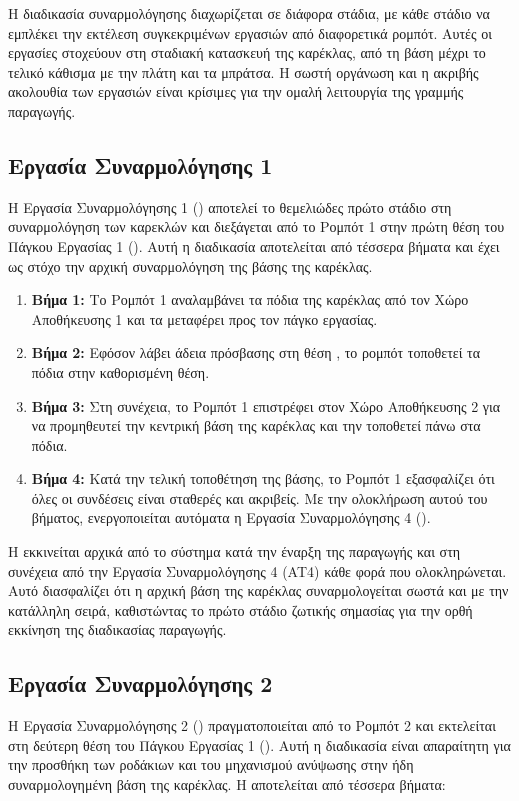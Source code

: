 Η διαδικασία συναρμολόγησης διαχωρίζεται σε διάφορα στάδια, με κάθε στάδιο να εμπλέκει την εκτέλεση συγκεκριμένων εργασιών από διαφορετικά ρομπότ. Αυτές οι εργασίες στοχεύουν στη σταδιακή κατασκευή της καρέκλας, από τη βάση μέχρι το τελικό κάθισμα με την πλάτη και τα μπράτσα. Η σωστή οργάνωση και η ακριβής ακολουθία των εργασιών είναι κρίσιμες για την ομαλή λειτουργία της γραμμής παραγωγής.

\subsection{Εργασία Συναρμολόγησης 1}
\noindent Η Εργασία Συναρμολόγησης 1 () αποτελεί το θεμελιώδες πρώτο στάδιο στη συναρμολόγηση των καρεκλών  και διεξάγεται από το Ρομπότ 1 στην πρώτη θέση του Πάγκου Εργασίας 1 (). Αυτή η διαδικασία αποτελείται από τέσσερα βήματα και έχει ως στόχο την αρχική συναρμολόγηση της βάσης της καρέκλας.

\begin{enumerate}
  \item \textbf{Βήμα 1:} Το Ρομπότ 1 αναλαμβάνει τα πόδια της καρέκλας από τον Χώρο Αποθήκευσης 1 και τα μεταφέρει προς τον πάγκο εργασίας.
  \item \textbf{Βήμα 2:} Εφόσον λάβει άδεια πρόσβασης στη θέση , το ρομπότ τοποθετεί τα πόδια στην καθορισμένη θέση.
  \item \textbf{Βήμα 3:} Στη συνέχεια, το Ρομπότ 1 επιστρέφει στον Χώρο Αποθήκευσης 2 για να προμηθευτεί την κεντρική βάση της καρέκλας και την τοποθετεί πάνω στα πόδια.
  \item \textbf{Βήμα 4:} Κατά την τελική τοποθέτηση της βάσης, το Ρομπότ 1 εξασφαλίζει ότι όλες οι συνδέσεις είναι σταθερές και ακριβείς. Με την ολοκλήρωση αυτού του βήματος, ενεργοποιείται αυτόματα η Εργασία Συναρμολόγησης 4 ().
\end{enumerate}

Η  εκκινείται αρχικά από το σύστημα κατά την έναρξη της παραγωγής και στη συνέχεια από την Εργασία Συναρμολόγησης 4 (AT4) κάθε φορά που ολοκληρώνεται. Αυτό διασφαλίζει ότι η αρχική βάση της καρέκλας συναρμολογείται σωστά και με την κατάλληλη σειρά, καθιστώντας το πρώτο στάδιο ζωτικής σημασίας για την ορθή εκκίνηση της διαδικασίας παραγωγής.

\subsection{Εργασία Συναρμολόγησης 2}
\noindent Η Εργασία Συναρμολόγησης 2 () πραγματοποιείται από το Ρομπότ 2 και εκτελείται στη δεύτερη θέση του Πάγκου Εργασίας 1 (). Αυτή η διαδικασία είναι απαραίτητη για την προσθήκη των ροδάκιων και του μηχανισμού ανύψωσης στην ήδη συναρμολογημένη βάση της καρέκλας. Η  αποτελείται από τέσσερα βήματα:

